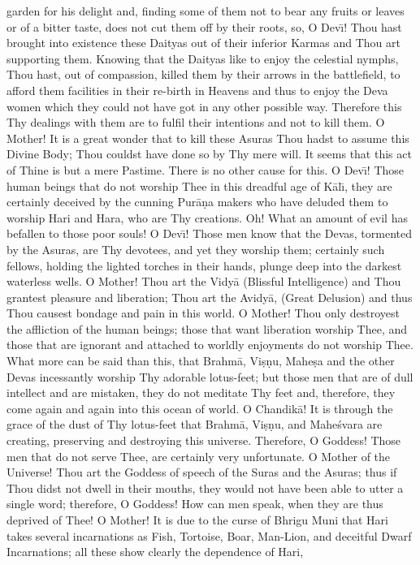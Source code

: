 garden for his delight and, finding some of them not to bear any fruits or leaves or of a bitter taste, does not cut them off by their roots, so, O Dev\={\i}! Thou hast brought into existence these Daityas out of their inferior Karmas and Thou art supporting them. Knowing that the Daityas like to enjoy the celestial nymphs, Thou hast, out of compassion, killed them by their arrows in the battlefield, to afford them facilities in their re-birth in Heavens and thus to enjoy the Deva women which they could not have got in any other possible way. Therefore this Thy dealings with them are to fulfil their intentions and not to kill them. O Mother! It is a great wonder that to kill these Asuras Thou hadst to assume this Divine Body; Thou couldst have done so by Thy mere will. It seems that this act of Thine is but a mere Pastime. There is no other cause for this. O Dev\={\i}! Those human beings that do not worship Thee in this dreadful age of K\=al\={\i}, they are certainly deceived by the cunning Pur\=a\d{n}a makers who have deluded them to worship Hari and Hara, who are Thy creations. Oh! What an amount of evil has befallen to those poor souls! O Dev\={\i}! Those men know that the Devas, tormented by the Asuras, are Thy devotees, and yet they worship them; certainly such fellows, holding the lighted torches in their hands, plunge deep into the darkest waterless wells. O Mother! Thou art the Vidy\=a (Blissful Intelligence) and Thou grantest pleasure and liberation; Thou art the Avidy\=a, (Great Delusion) and thus Thou causest bondage and pain in this world. O Mother! Thou only destroyest the affliction of the human beings; those that want liberation worship Thee, and those that are ignorant and attached to worldly enjoyments do not worship Thee. What more can be said than this, that Brahm\=a, Vi\d{s}\d{n}u, Mahe\d{s}a and the other Devas incessantly worship Thy adorable lotus-feet; but those men that are of dull intellect and are mistaken, they do not meditate Thy feet and, therefore, they come again and again into this ocean of world. O Chandik\=a! It is through the grace of the dust of Thy lotus-feet that Brahm\=a, Vi\d{s}\d{n}u, and Mahe\'svara are creating, preserving and destroying this universe. Therefore, O Goddess! Those men that do not serve Thee, are certainly very unfortunate. O Mother of the Universe! Thou art the Goddess of speech of the Suras and the Asuras; thus if Thou didst not dwell in their mouths, they would not have been able to utter a single word; therefore, O Goddess! How can men speak, when they are thus deprived of Thee! O Mother! It is due to the curse of Bhrigu Muni that Hari takes several incarnations as Fish, Tortoise, Boar, Man-Lion, and deceitful Dwarf Incarnations; all these show clearly the dependence of Hari,

